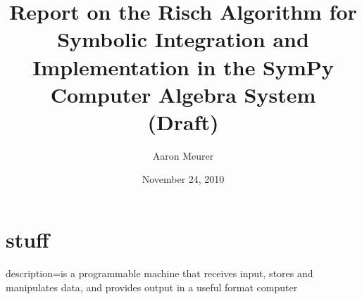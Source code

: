 \documentclass[12pt]{report}
\begin{document}
\title{Report on the Risch Algorithm for Symbolic
Integration and Implementation in the Sym\-Py Computer Algebra System \\(Draft)}
\author{Aaron Meurer}
\date{November 24, 2010}
\maketitle
\tableofcontents
\listoffigures
\listoftables

\section{stuff}


{
  description={is a programmable machine that receives input,
               stores and manipulates data, and provides
               output in a useful format}
}
\makeglossaries
\gls{computer}

\printglossaries

\nocite{*}


\end{document}
